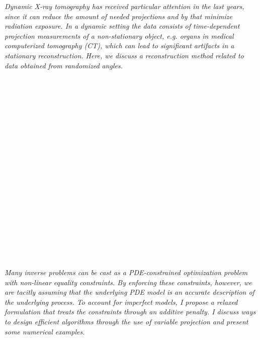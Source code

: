 \begin{multicols}{2}
\\ 
        \\
        \\\\
\\
      \textit{Dynamic X-ray tomography has received particular attention in the last years, since it can reduce the amount of needed projections and by that minimize radiation exposure. In a dynamic setting the data consists of time-dependent projection measurements of a non-stationary object, e.g. organs in medical computerized tomography (CT), which can lead to significant artifacts in a stationary reconstruction. Here, we discuss a reconstruction method related to data obtained from randomized angles.}\\
\\ 
        \\
        \\\\
        \\
        \\\\
        \\
        \\\\
        \\
        \\\\
        \\
        \\\\
        \\
        \\\\
\\
      \textit{Many inverse problems can be cast as a PDE-constrained optimization problem with non-linear equality constraints. By enforcing these constraints, however, we are tacitly assuming that the underlying PDE model is an accurate description of the underlying process. To account for imperfect models, I propose a relaxed formulation that treats the constraints through an additive penalty. I discuss ways to design efficient algorithms through the use of variable projection and present some numerical examples.}\\
\\ 
        \\
        \\\\
\\
\end{multicols}
